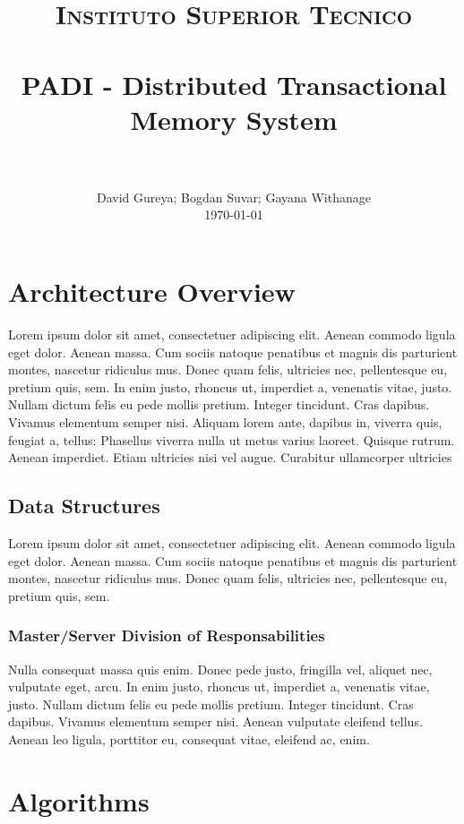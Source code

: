 \documentclass[paper=a4, fontsize=11pt]{scrartcl}
\title{
        \usefont{OT1}{bch}{b}{n}
        \normalfont \normalsize \textsc{Instituto Superior Tecnico} \\ [25pt]
        \horrule{0.5pt} \\[0.4cm]
        \huge PADI - Distributed Transactional Memory System \\
        \horrule{2pt} \\[0.5cm]
}
\author{
        \normalfont                                 \normalsize
        David Gureya; Bogdan Suvar; Gayana Withanage\\[-3pt]        \normalsize
        \today
}
\date{}
\numberwithin{equation}{section}        %
\numberwithin{figure}{section}          %
\numberwithin{table}{section}               %
\begin{document}
\maketitle
\section{Architecture Overview}
Lorem ipsum dolor sit amet, consectetuer adipiscing elit. Aenean commodo ligula eget dolor. Aenean massa. Cum sociis natoque penatibus et magnis dis parturient montes, nascetur ridiculus mus. Donec quam felis, ultricies nec, pellentesque eu, pretium quis, sem. In enim justo, rhoncus ut, imperdiet a, venenatis vitae, justo. Nullam dictum felis eu pede mollis pretium. Integer tincidunt. Cras dapibus. Vivamus elementum semper nisi. Aliquam lorem ante, dapibus in, viverra quis, feugiat a, tellus:
Phasellus viverra nulla ut metus varius laoreet. Quisque rutrum. Aenean imperdiet. Etiam ultricies nisi vel augue. Curabitur ullamcorper ultricies 

\subsection{Data Structures}
Lorem ipsum dolor sit amet, consectetuer adipiscing elit. 
Aenean commodo ligula eget dolor. Aenean massa. Cum sociis natoque penatibus et magnis dis parturient montes, nascetur ridiculus mus. Donec quam felis, ultricies nec, pellentesque eu, pretium quis, sem.

\subsubsection{Master/Server Division of Responsabilities}
Nulla consequat massa quis enim. Donec pede justo, fringilla vel, aliquet nec, vulputate eget, arcu. In enim justo, rhoncus ut, imperdiet a, venenatis vitae, justo. Nullam dictum felis eu pede mollis pretium. Integer tincidunt. Cras dapibus. Vivamus elementum semper nisi. Aenean vulputate eleifend tellus. Aenean leo ligula, porttitor eu, consequat vitae, eleifend ac, enim.

\section{Algorithms}
\end{document}

